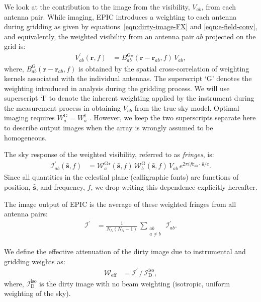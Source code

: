 \documentclass[a4paper,fleqn,usenatbib]{mnras}
\newcommand{\Nant}{N_\textrm{A}}
\begin{document}
We look at the contribution to the image from the visibility, $V_{ab}$, from each antenna pair. While imaging, EPIC introduces a weighting to each antenna during gridding as given by equations~\ref{eqn:dirty-image-FX} and \ref{eqn:e-field-conv}, and equivalently, the weighted visibility from an antenna pair $ab$ projected on the grid is:
\begin{align}
  V^\prime_{ab}(\mathbf{r},f) &= B^{\textrm{G}\star}_{ab}(\mathbf{r}-\mathbf{r}_{ab},f)\,V_{ab},
\end{align}
where, $B^\textrm{G}_{ab}(\mathbf{r}-\mathbf{r}_{ab},f)$ is obtained by the spatial cross-correlation of weighting kernels associated with the individual antennas. The superscript `$\textrm{G}$' denotes the weighting introduced in analysis during the gridding process. We will use superscript `I' to denote the inherent weighting applied by the instrument during the measurement process in obtaining $V_{ab}$ from the true sky model. Optimal imaging requires $W^\textrm{G}_a = W^\textrm{I}_a$ \citep{mor09,mor11}. However, we keep the two superscripts separate here to describe output images when the array is wrongly assumed to be homogeneous.

The sky response of the weighted visibility, referred to as {\it fringes}, is:
\begin{align}
  \mathcal{I}^\prime_{ab}(\hat{\mathbf{s}},f) &= \mathcal{W}^{\textrm{G}\star}_a(\hat{\mathbf{s}},f)\,\mathcal{W}^\textrm{G}_b(\hat{\mathbf{s}},f)\,V_{ab}\,e^{2\pi i f\mathbf{r}_{ab}\!\cdot\,\hat{\mathbf{s}}/c}.
\end{align}
Since all quantities in the celestial plane (calligraphic fonts) are functions of position, $\hat{\mathbf{s}}$, and frequency, $f$, we drop writing this dependence explicitly hereafter.

The image output of EPIC is the average of these weighted fringes from all antenna pairs:
\begin{align}\label{eqn:wt-dirty-image-EPIC}
  \mathcal{I}^\prime &= \frac{1}{\Nant(\Nant-1)}\,\sum_{\substack{ab\\a\ne b}}\,\mathcal{I}^\prime_{ab}.
\end{align}

We define the effective attenuation of the dirty image due to instrumental and gridding weights as:
\begin{align}\label{eqn:effective-weighting}
  \mathcal{W}_\textrm{eff} &= \mathcal{I}^\prime\, / \,\mathcal{I}_\textrm{D}^\textrm{iso},
\end{align}
where, $\mathcal{I}_\textrm{D}^\textrm{iso}$ is the dirty image with no beam weighting (isotropic, uniform weighting of the sky).
\end{document}
